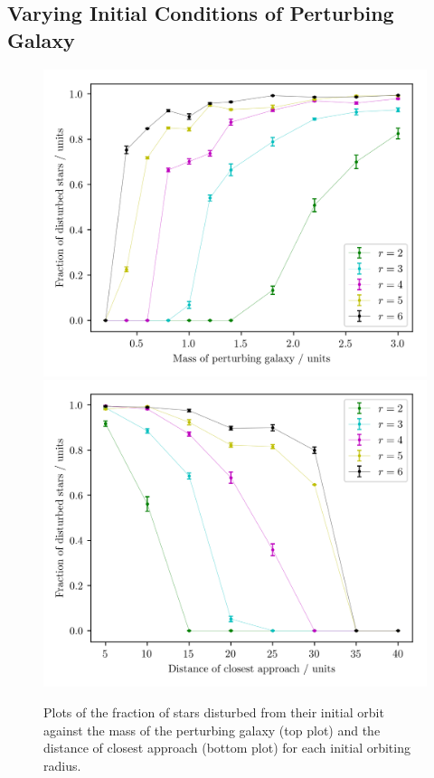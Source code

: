 \documentclass[twoside,twocolumn]{article}
\begin{document}
    \subsection{Varying Initial Conditions of Perturbing Galaxy}

        \begin{figure}
            \centering
            \includegraphics[width=\linewidth]{images/plot_fraction_mass.png}
            \includegraphics[width=\linewidth]{images/plot_fraction_rmin.png}
            \caption{Plots of the fraction of stars disturbed from their initial orbit against the mass of the perturbing galaxy (top plot) and the distance of closest approach (bottom plot) for each initial orbiting radius.}
            \label{figure:varying_fraction}
        \end{figure}
\end{document}
